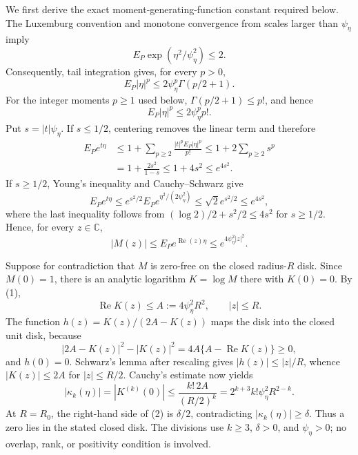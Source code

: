 We first derive the exact moment-generating-function constant required below.  The Luxemburg convention and monotone convergence from scales larger than \(\psi_{\eta}\) imply
\[
 E_P\exp(\eta^2/\psi_{\eta}^2)\le2.
\]
Consequently, tail integration gives, for every \(p>0\),
\[
 E_P|\eta|^p
 \le2\psi_{\eta}^p\Gamma(p/2+1).
\]
For the integer moments \(p\ge1\) used below, \(\Gamma(p/2+1)\le p!\), and hence
\[
 E_P|\eta|^p\le2\psi_{\eta}^p p!.
\]
Put \(s=|t|\psi_{\eta}\).  If \(s\le1/2\), centering removes the linear term and therefore
\[
 \begin{aligned}
 E_Pe^{t\eta}
 &\le1+\sum_{p\ge2}\frac{|t|^pE_P|\eta|^p}{p!}
 \le1+2\sum_{p\ge2}s^p\\
 &=1+\frac{2s^2}{1-s}
 \le1+4s^2
 \le e^{4s^2}.
 \end{aligned}
\]
If \(s\ge1/2\), Young's inequality and Cauchy--Schwarz give
\[
 E_Pe^{t\eta}
 \le e^{s^2/2}E_Pe^{\eta^2/(2\psi_{\eta}^2)}
 \le\sqrt2e^{s^2/2}
 \le e^{4s^2},
\]
where the last inequality follows from \((\log2)/2+s^2/2\le4s^2\) for \(s\ge1/2\).  Hence, for every \(z\in\mathbb C\),
\[
 |M(z)|\le E_Pe^{\operatorname{Re}(z)\eta}
 \le e^{4\psi_{\eta}^2|z|^2}. \tag{1}
\]

Suppose for contradiction that \(M\) is zero-free on the closed radius-\(R\) disk.  Since \(M(0)=1\), there is an analytic logarithm \(K=\log M\) there with \(K(0)=0\).  By (1),
\[
 \operatorname{Re}K(z)\le A:=4\psi_{\eta}^2R^2,
 \qquad |z|\le R.
\]
The function \(h(z)=K(z)/(2A-K(z))\) maps the disk into the closed unit disk, because
\[
 |2A-K(z)|^2-|K(z)|^2=4A\{A-\operatorname{Re}K(z)\}\ge0,
\]
and \(h(0)=0\).  Schwarz's lemma after rescaling gives \(|h(z)|\le|z|/R\), whence \(|K(z)|\le2A\) for \(|z|\le R/2\).  Cauchy's estimate now yields
\[
 |\kappa_k(\eta)|=|K^{(k)}(0)|
 \le \frac{k!\,2A}{(R/2)^k}
 =2^{k+3}k!\psi_{\eta}^2R^{2-k}. \tag{2}
\]
At \(R=R_0\), the right-hand side of (2) is \(\delta/2\), contradicting \(|\kappa_k(\eta)|\ge\delta\).  Thus a zero lies in the stated closed disk.  The divisions use \(k\ge3\), \(\delta>0\), and \(\psi_{\eta}>0\); no overlap, rank, or positivity condition is involved.
